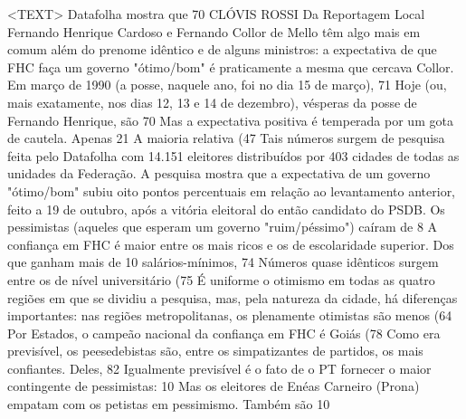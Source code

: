<TEXT>
Datafolha mostra que 70%
CLÓVIS ROSSI 
Da Reportagem Local 
Fernando Henrique Cardoso e Fernando Collor de Mello têm algo mais em comum além do prenome idêntico e de alguns ministros: a expectativa de que FHC faça um governo "ótimo/bom" é praticamente a mesma que cercava Collor.
Em março de 1990 (a posse, naquele ano, foi no dia 15 de março), 71%
Hoje (ou, mais exatamente, nos dias 12, 13 e 14 de dezembro), vésperas da posse de Fernando Henrique, são 70%
Mas a expectativa positiva é temperada por um gota de cautela. Apenas 21%
A maioria relativa (47%
Tais números surgem de pesquisa feita pelo Datafolha com 14.151 eleitores distribuídos por 403 cidades de todas as unidades da Federação.
A pesquisa mostra que a expectativa de um governo "ótimo/bom" subiu oito pontos percentuais em relação ao levantamento anterior, feito a 19 de outubro, após a vitória eleitoral do então candidato do PSDB.
Os pessimistas (aqueles que esperam um governo "ruim/péssimo") caíram de 8%
A confiança em FHC é maior entre os mais ricos e os de escolaridade superior. Dos que ganham mais de 10 salários-mínimos, 74%
Números quase idênticos surgem entre os de nível universitário (75%
É uniforme o otimismo em todas as quatro regiões em que se dividiu a pesquisa, mas, pela natureza da cidade, há diferenças importantes: nas regiões metropolitanas, os plenamente otimistas são menos (64%
Por Estados, o campeão nacional da confiança em FHC é Goiás (78%
Como era previsível, os peesedebistas são, entre os simpatizantes de partidos, os mais confiantes. Deles, 82%
Igualmente previsível é o fato de o PT fornecer o maior contingente de pessimistas: 10%
Mas os eleitores de Enéas Carneiro (Prona) empatam com os petistas em pessimismo. Também são 10%

